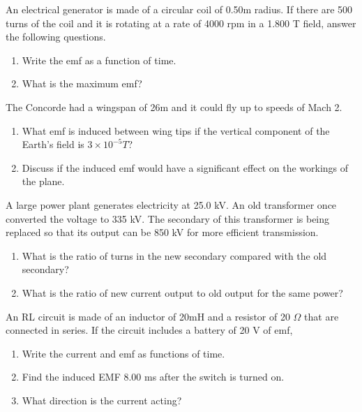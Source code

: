 \documentclass[11pt,addpoints]{exam}
\begin{document}
	\begin{questions}
		\question An electrical generator is made of a circular coil of 0.50m radius. If there are 500 turns of the coil and it is rotating at a rate of 4000 rpm in a 1.800 T field, answer the following questions.
		\begin{enumerate}[label=(\alph*)]
			\item Write the emf as a function of time.
			\item What is the maximum emf?
		\end{enumerate}
		\question The Concorde had a wingspan of 26m and it could fly up to speeds of Mach 2. 
			  \begin{enumerate}[label=(\alph*)]
			  	\item What emf is induced between wing tips if the vertical component of the Earth’s field is $3\times10^{-5}T$?
			  	\item Discuss if the induced emf would have a significant effect on the workings of the plane.
			  \end{enumerate}
		\question A large power plant generates electricity at 25.0 kV. An old transformer once converted the voltage to 335 kV. The secondary of this transformer is being replaced so that its output can be 850 kV for more efficient transmission.
		\begin{enumerate}[label=(\roman*)]
			\item What is the ratio of turns in the new secondary compared with the old secondary? 
			\item What is the ratio of new current output to old output for the same power? 
		\end{enumerate} 
		\question An RL circuit is made of an inductor of 20mH and a resistor of 20 $\Omega$ that are connected in series. If the circuit includes a battery of 20 V of emf, 
		\begin{enumerate}[label=(\roman*)]
			\item Write the current and emf as functions of time.
			\item Find the induced EMF 8.00 ms after the switch is turned on.
			\item What direction is the current acting?	
		\end{enumerate} 

\end{questions}
\end{document}
